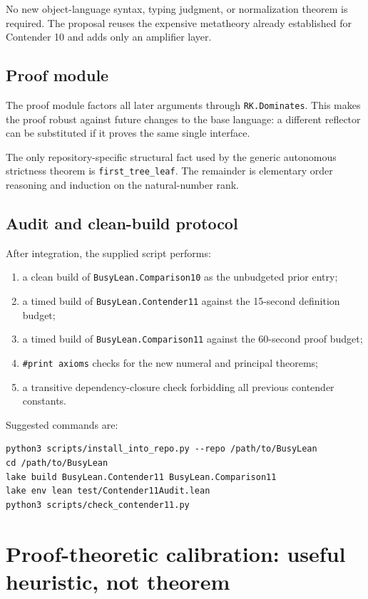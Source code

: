 \documentclass[11pt,oneside]{article}
\theoremstyle{definition}
\newcommand{\code}[1]{\texttt{#1}}
\begin{document}
No new object-language syntax, typing judgment, or normalization theorem is
required.  The proposal reuses the expensive metatheory already established
for Contender 10 and adds only an amplifier layer.

\subsection{Proof module}

The proof module factors all later arguments through
\code{RK.Dominates}.  This makes the proof robust against future changes to the
base language: a different reflector can be substituted if it proves the same
single interface.

The only repository-specific structural fact used by the generic autonomous
strictness theorem is \code{first\_tree\_leaf}.  The remainder is elementary
order reasoning and induction on the natural-number rank.

\subsection{Audit and clean-build protocol}

After integration, the supplied script performs:
\begin{enumerate}
  \item a clean build of \code{BusyLean.Comparison10} as the unbudgeted prior entry;
  \item a timed build of \code{BusyLean.Contender11} against the 15-second definition budget;
  \item a timed build of \code{BusyLean.Comparison11} against the 60-second proof budget;
  \item \code{\#print axioms} checks for the new numeral and principal theorems;
  \item a transitive dependency-closure check forbidding all previous contender constants.
\end{enumerate}

Suggested commands are:
\begin{Verbatim}[fontsize=\small,frame=single,framesep=2mm,
  rulecolor=\color{Navy},bgcolor=CodeBg]
python3 scripts/install_into_repo.py --repo /path/to/BusyLean
cd /path/to/BusyLean
lake build BusyLean.Contender11 BusyLean.Comparison11
lake env lean test/Contender11Audit.lean
python3 scripts/check_contender11.py
\end{Verbatim}

\section{Proof-theoretic calibration: useful heuristic, not theorem}
\end{document}
